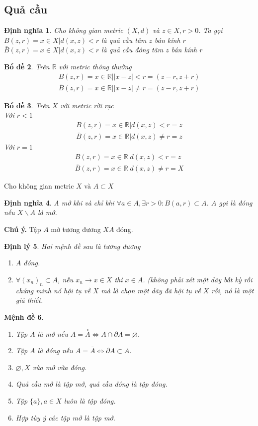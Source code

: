 \documentclass[a4paper, 12pt]{article}
\newtheorem{theorem}{Định lý}[section]
\newtheorem{definition}[theorem]{Định nghĩa}
\newtheorem{lemma}[theorem]{Bổ đề}
\newtheorem{proposition}[theorem]{Mệnh đề}
\newcommand{\xd}{\\[7pt]}
\begin{document}
\subsection{Quả cầu}
\begin{definition}
    Cho không gian metric $(X,d)$ và $z \in X, r>0$. Ta gọi\xd
    $B(z,r) = {x \in X|d(x,z) < r}$ là quả cầu tâm $z$ bán kính $r$\xd
    $\bar{B}(z,r) = {x \in X|d(x,z) < r}$ là quả cầu đóng tâm $z$ bán kính $r$
\end{definition}
\begin{lemma}
    Trên $\mathbb{R}$ với metric thông thường
    \begin{align*}
        B(z,r)={x\in \mathbb{R}||x-z| < r} = (z - r,z + r)\xd
        \bar{B}(z,r)={x\in \mathbb{R}||x-z| \neq r} = (z - r,z + r)
    \end{align*}
\end{lemma}
\begin{lemma}
    Trên $X$ với metric rời rạc\xd
    Với $r < 1$
    \begin{align*}
        B(z,r)={x\in \mathbb{R}|d(x,z) < r} = {{z}}\xd
        \bar{B}(z,r)={x\in \mathbb{R}|d(x,z) \neq r} = {{z}}
    \end{align*}
    Với $r = 1$
    \begin{align*}
        B(z,r)={x\in \mathbb{R}|d(x,z) < r} = {{z}}\xd
        \bar{B}(z,r)={x\in \mathbb{R}|d(x,z) \neq r} = X
    \end{align*}
\end{lemma}
Cho không gian metric $X$ và $A \subset X$
\begin{definition}
A mở khi và chỉ khi $\forall a \in A, \exists r>0: B(a,r) \subset A$. $A$ gọi là đóng nếu $X \backslash A$ là mở.
\end{definition}
\textbf{Chú ý.} Tập $A$ mở tương đương $X A$ đóng.
\begin{theorem}
Hai mệnh đề sau là tương đương
\begin{enumerate}
    \item $A$ đóng.
    \item $\forall (x_n)_n \subset A$, nếu $x_n \to x \in X$ thì $x \in A$. (không phải xét một dãy bất kỳ rồi chứng minh nó hội tụ về $X$ mà là chọn một dãy đã hội tụ về $X$ rồi, nó là một giả thiết. \end{enumerate}
\end{theorem}
\begin{proposition}
\begin{enumerate}
    \item Tập $A$ là mở nếu $A=\overset{\circ}{A} \Longleftrightarrow A \cap \partial A= \varnothing$.
    \item Tập $A$ là đóng nếu $A=\bar{A} \Longleftrightarrow \partial A \subset A$.
    \item $\varnothing, X$ vừa mở vừa đóng.
    \item Quả cầu mở là tập mở, quả cầu đóng là tập đóng.
    \item Tập $\{a\}, a \in X$ luôn là tập đóng.
    \item Hợp tùy ý các tập mở là tập mở.
\end{enumerate}
\end{proposition}
\end{document}

